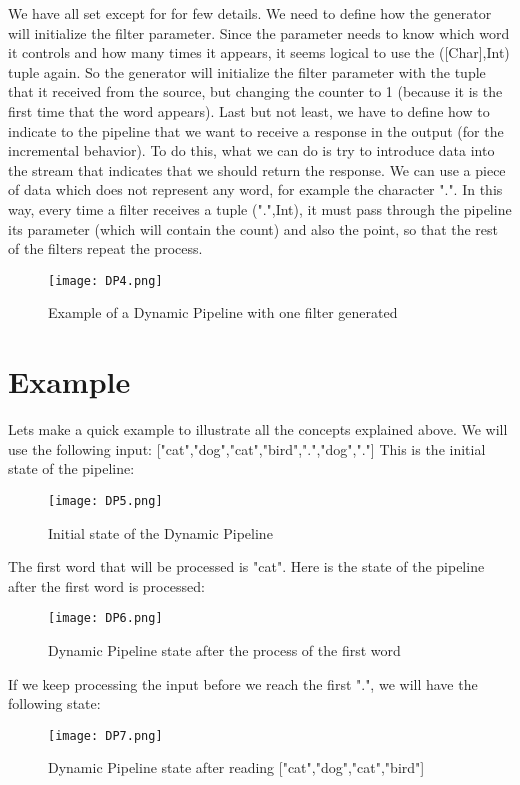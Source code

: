 We have all set except for for few details.
We need to define how the generator will initialize the filter parameter. 
Since the parameter needs to know which word it controls and how many times it appears, it seems logical to use the ([Char],Int) tuple again.
So the generator will initialize the filter parameter with the tuple that it received from the source, but changing the counter to 1 (because it is the first time that the word appears).
Last but not least, we have to define how to indicate to the pipeline that we want to receive a response in the output (for the incremental behavior).
To do this, what we can do is try to introduce data into the stream that indicates that we should return the response.
We can use a piece of data which does not represent any word, for example the character ".".
In this way, every time a filter receives a tuple (".",Int), it must pass through the pipeline its parameter (which will contain the count) and also the point, so that the rest of the filters repeat the process.
\begin{figure}[H]
    \centering
    \texttt{[image: DP4.png]}
    \caption{Example of a Dynamic Pipeline with one filter generated}
    \label{fig:DP4}
\end{figure}

\section{Example}
Lets make a quick example to illustrate all the concepts explained above.
We will use the following input: ["cat","dog","cat","bird",".","dog","."]
This is the initial state of the pipeline:
\begin{figure}[H]
    \centering
    \texttt{[image: DP5.png]}
    \caption{Initial state of the Dynamic Pipeline}
    \label{fig:DP5}
\end{figure}

The first word that will be processed is "cat". 
Here is the state of the pipeline after the first word is processed:
\begin{figure}[H]
    \centering
    \texttt{[image: DP6.png]}
    \caption{Dynamic Pipeline state after the process of the first word}
    \label{fig:DP6}
\end{figure}

If we keep processing the input before we reach the first ".", we will have the following state:
\begin{figure}[H]
    \centering
    \texttt{[image: DP7.png]}
    \caption{Dynamic Pipeline state after reading ["cat","dog","cat","bird"]}
    \label{fig:DP7}
\end{figure}

